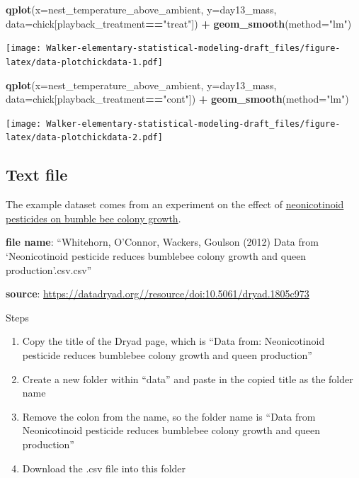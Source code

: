 \documentclass[]{book}
\newenvironment{Shaded}{\begin{snugshade}}{\end{snugshade}}
\newcommand{\KeywordTok}[1]{\textcolor[rgb]{0.13,0.29,0.53}{\textbf{#1}}}
\newcommand{\DataTypeTok}[1]{\textcolor[rgb]{0.13,0.29,0.53}{#1}}
\newcommand{\StringTok}[1]{\textcolor[rgb]{0.31,0.60,0.02}{#1}}
\newcommand{\OperatorTok}[1]{\textcolor[rgb]{0.81,0.36,0.00}{\textbf{#1}}}
\newcommand{\NormalTok}[1]{#1}
\providecommand{\tightlist}{%
  \setlength{\itemsep}{0pt}\setlength{\parskip}{0pt}}
\begin{document}
\begin{Shaded}
\begin{Highlighting}[]
\KeywordTok{qplot}\NormalTok{(}\DataTypeTok{x=}\NormalTok{nest_temperature_above_ambient, }\DataTypeTok{y=}\NormalTok{day13_mass, }\DataTypeTok{data=}\NormalTok{chick[playback_treatment}\OperatorTok{==}\StringTok{"treat"}\NormalTok{]) }\OperatorTok{+}
\StringTok{  }\KeywordTok{geom_smooth}\NormalTok{(}\DataTypeTok{method=}\StringTok{"lm"}\NormalTok{)}
\end{Highlighting}
\end{Shaded}

\texttt{[image: Walker-elementary-statistical-modeling-draft\_files/figure-latex/data-plotchickdata-1.pdf]}

\begin{Shaded}
\begin{Highlighting}[]
\KeywordTok{qplot}\NormalTok{(}\DataTypeTok{x=}\NormalTok{nest_temperature_above_ambient, }\DataTypeTok{y=}\NormalTok{day13_mass, }\DataTypeTok{data=}\NormalTok{chick[playback_treatment}\OperatorTok{==}\StringTok{"cont"}\NormalTok{]) }\OperatorTok{+}
\StringTok{  }\KeywordTok{geom_smooth}\NormalTok{(}\DataTypeTok{method=}\StringTok{"lm"}\NormalTok{)}
\end{Highlighting}
\end{Shaded}

\texttt{[image: Walker-elementary-statistical-modeling-draft\_files/figure-latex/data-plotchickdata-2.pdf]}

\subsection{Text file}\label{text-file}

The example dataset comes from an experiment on the effect of
\href{http://science.sciencemag.org/content/early/2012/03/28/science.1215025}{neonicotinoid
pesticides on bumble bee colony growth}.

\textbf{file name}: ``Whitehorn, O'Connor, Wackers, Goulson (2012) Data
from `Neonicotinoid pesticide reduces bumblebee colony growth and queen
production'.csv.csv''

\textbf{source}:
\url{https://datadryad.org//resource/doi:10.5061/dryad.1805c973}

Steps

\begin{enumerate}
\def\labelenumi{\arabic{enumi}.}
\tightlist
\item
  Copy the title of the Dryad page, which is ``Data from: Neonicotinoid
  pesticide reduces bumblebee colony growth and queen production''
\item
  Create a new folder within ``data'' and paste in the copied title as
  the folder name
\item
  Remove the colon from the name, so the folder name is ``Data from
  Neonicotinoid pesticide reduces bumblebee colony growth and queen
  production''
\item
  Download the .csv file into this folder
\end{enumerate}
\end{document}
